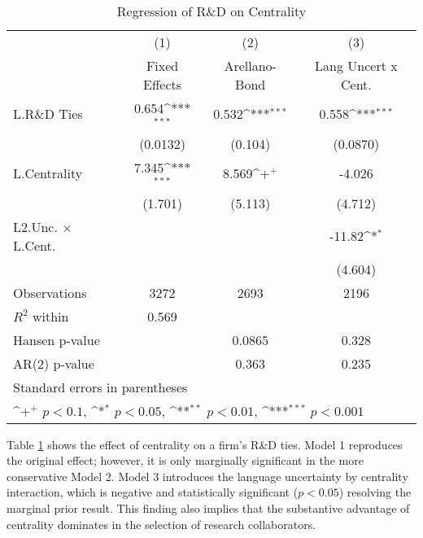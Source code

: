 \begin{table}[htbp]\centering \caption{Regression of R\&D on Centrality\label{r8}}
{
\def\sym#1{\ifmmode^{#1}\else\(^{#1}\)\fi}
\begin{tabular}{l*{3}{c}}
\hline\hline
                    &\multicolumn{1}{c}{(1)}&\multicolumn{1}{c}{(2)}&\multicolumn{1}{c}{(3)}\\
                    &\multicolumn{1}{c}{Fixed Effects}&\multicolumn{1}{c}{Arellano-Bond}&\multicolumn{1}{c}{Lang Uncert x Cent.}\\
\hline
L.R\&D Ties         &       0.654\sym{***}&       0.532\sym{***}&       0.558\sym{***}\\
                    &    (0.0132)         &     (0.104)         &    (0.0870)         \\
L.Centrality        &       7.345\sym{***}&       8.569\sym{+}  &      -4.026         \\
                    &     (1.701)         &     (5.113)         &     (4.712)         \\
L2.Unc. $\times$ L.Cent.&                     &                     &      -11.82\sym{*}  \\
                    &                     &                     &     (4.604)         \\
\hline
Observations        &        3272         &        2693         &        2196         \\
$R^2$ within                &       0.569         &                     &                     \\
Hansen p-value             &                     &      0.0865         &       0.328         \\
AR(2) p-value                &                     &       0.363         &       0.235         \\
\hline\hline
\multicolumn{4}{l}{\footnotesize Standard errors in parentheses}\\
\multicolumn{4}{l}{\footnotesize \sym{+} \(p<0.1\), \sym{*} \(p<0.05\), \sym{**} \(p<0.01\), \sym{***} \(p<0.001\)}\\
\end{tabular}
}
\end{table}

Table \ref{r8} shows the effect of centrality on a firm's R\&D ties. Model 1 reproduces the original effect; however, it is only marginally significant in the more conservative Model 2. Model 3 introduces the language uncertainty by centrality interaction, which is negative and statistically significant ($p<0.05$) resolving the marginal prior result. This finding also implies that the substantive advantage of centrality dominates in the selection of research collaborators.

